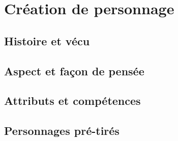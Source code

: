 \chapter{Création de personnage}

\section{Histoire et vécu}

\section{Aspect et façon de pensée}

\section{Attributs et compétences}

\section{Personnages pré-tirés}
